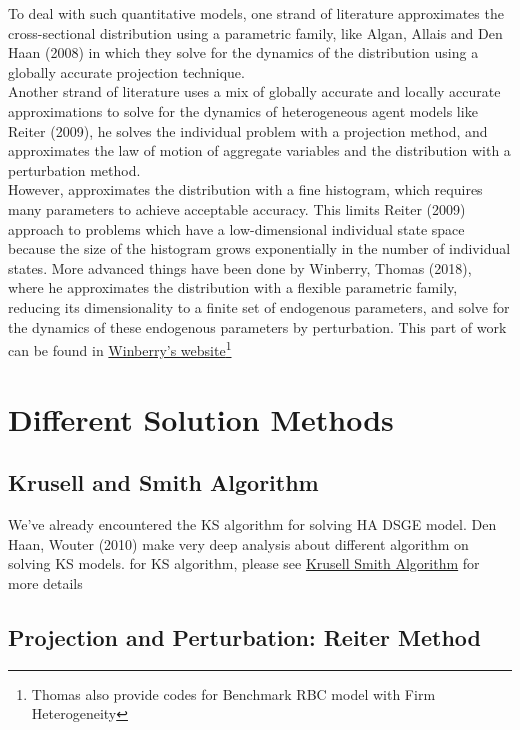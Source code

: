 To deal with such quantitative models, one strand of literature approximates the cross-sectional distribution using a parametric family, like Algan, Allais and Den Haan (2008)\cite{algan2008solving} in which they solve for the dynamics of the distribution using a globally accurate projection technique.\\

Another strand of literature uses a mix of globally accurate and locally accurate approximations to solve for the dynamics of heterogeneous agent models like Reiter (2009)\cite{reiter2009solving}, he solves the individual problem with a projection method, and approximates the law of motion of aggregate variables and the distribution with a perturbation method.\\

However, approximates the distribution with a fine histogram, which requires many parameters to achieve acceptable accuracy. This limits Reiter (2009)\cite{reiter2009solving} approach to problems which have a low-dimensional individual state space because the size of the histogram grows exponentially in the number of individual states. More advanced things have been done by Winberry, Thomas (2018)\cite{winberry2018method}, where he approximates the distribution with a flexible parametric family, reducing its dimensionality to a finite set of endogenous parameters, and solve for the dynamics of these endogenous parameters by perturbation. This part of work can be found in  \href{http://faculty.chicagobooth.edu/thomas.winberry/research/index.html}{Winberry's website}\footnote{Thomas also provide codes for Benchmark RBC model with Firm Heterogeneity}

\section{Different Solution Methods}
\subsection{Krusell and Smith Algorithm}

We've already encountered the KS algorithm for solving HA DSGE model. Den Haan, Wouter (2010)\cite{den2010comparison} make very deep analysis about different algorithm on solving KS models. for KS algorithm, please see \href{https://github.com/davidrpugh/pyeconomics/wiki/Krusell-Smith-Algorithm}{Krusell Smith Algorithm} for more details

\subsection{Projection and Perturbation: Reiter Method}

